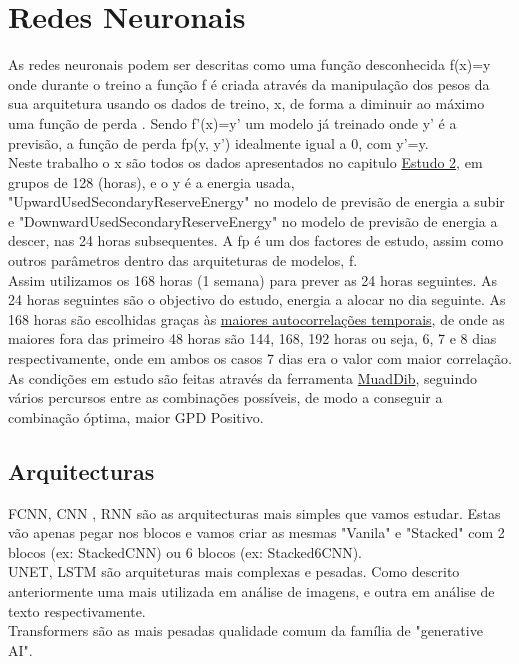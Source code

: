 \section{Redes Neuronais}

As redes neuronais podem ser descritas como uma função desconhecida f(x)=y onde durante o treino a função f é criada através da manipulação dos pesos da sua arquitetura usando os dados de treino, x, de forma a diminuir ao máximo uma função de perda . Sendo f'(x)=y' um modelo já treinado onde y' é a previsão, a função de perda fp(y, y') idealmente igual a 0, com y'=y.\\
Neste trabalho o x são todos os dados apresentados no capitulo \hyperref[ch:estudo_2]{Estudo 2}, em grupos de 128 (horas), e o y é a energia usada, "UpwardUsedSecondaryReserveEnergy" no modelo de previsão de energia a subir e "DownwardUsedSecondaryReserveEnergy" no modelo de previsão de energia a descer, nas 24 horas subsequentes. A fp é um dos factores de estudo, assim como outros parâmetros dentro das arquiteturas de modelos, f.\\
Assim utilizamos os 168 horas (1 semana) para prever as 24 horas seguintes. As 24 horas seguintes são o objectivo do estudo, energia a alocar no dia seguinte. As 168 horas são escolhidas graças às \hyperref[tab:tempcorr]{maiores autocorrelações temporais}, de onde as maiores fora das primeiro 48 horas são 144, 168, 192 horas ou seja, 6, 7 e 8 dias respectivamente, onde em ambos os casos 7 dias era o valor com maior correlação.\\
As condições em estudo são feitas através da ferramenta \hyperref[se:muaddib]{MuadDib}, seguindo vários percursos entre as combinações possíveis, de modo a conseguir a combinação óptima, maior GPD Positivo.\\


\subsection{Arquitecturas}

\gls{FCNN}, \gls{CNN} , RNN são as arquitecturas mais simples que vamos estudar. Estas vão apenas pegar nos blocos e vamos criar as mesmas "Vanila" e "Stacked" com 2 blocos (ex: StackedCNN) ou 6 blocos (ex: Stacked6CNN).\\
UNET, \gls{LSTM} são arquiteturas mais complexas e pesadas. Como descrito anteriormente uma mais utilizada em análise de imagens, e outra em análise de texto respectivamente.\\
Transformers são as mais pesadas qualidade comum da família de "generative AI".

